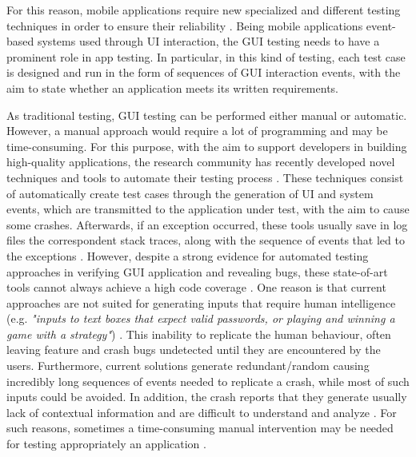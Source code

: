 For this reason, mobile applications require new specialized and different testing techniques in order to ensure their reliability \cite{muccini}. Being mobile applications event-based systems used through UI interaction, the GUI testing needs to have a prominent role in app testing. In particular, in this kind of testing, each test case is designed and run in the form of sequences of GUI interaction events, with the aim to state whether an application meets its written requirements. 

As traditional testing, GUI testing can be performed either manual or automatic. However, a manual approach would require a lot of programming and may be time-consuming. 
For this purpose, with the aim to support developers in building high-quality applications, the research community has recently developed novel techniques and tools to automate their testing process \cite{sapienz, dynodroid ,muccini,Hu:2011:AGT:1982595.1982612}. 
These techniques consist of automatically create test cases through the generation of UI and system events, which are transmitted to the application under test, with the aim to cause some crashes. Afterwards, if an exception occurred, these tools usually save in log files the correspondent stack traces, along with the sequence of events that led to the exceptions \cite{muccini}. 
However, despite a strong evidence for automated testing approaches in verifying GUI application and revealing bugs, these state-of-art tools cannot always achieve a high code coverage \cite{Nagappan2015}. 
One reason is that current approaches are not suited for generating inputs that require human intelligence (e.g. \textit{"inputs to text boxes that expect valid passwords, or playing and winning a game with a strategy"}) \cite{dynodroid}. This inability to replicate the human behaviour, often leaving feature and crash bugs undetected until they are encountered by the users.
Furthermore, current solutions generate redundant/random causing incredibly long sequences of events needed to replicate a crash, while most of such inputs could be avoided. 
In addition, the crash reports that they generate usually lack of contextual information and are difficult to understand and analyze \cite{Chen, Joorabchi}. 
For such reasons, sometimes a time-consuming manual intervention may be needed for testing appropriately an application \cite{Nagappan2015}. 

